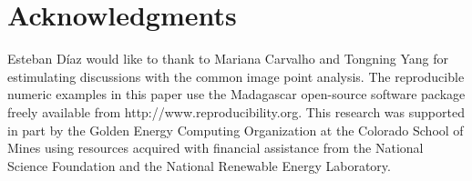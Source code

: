 \section{Acknowledgments}
Esteban D\'{i}az would like to thank to Mariana Carvalho and Tongning Yang for estimulating discussions
with the common image point analysis.
%
%
The reproducible numeric examples in this paper use the Madagascar open-source software package freely available from http://www.reproducibility.org.
%
This research was supported in part by the Golden Energy Computing Organization at the Colorado School of Mines using resources acquired with financial assistance from the National Science Foundation and the National Renewable Energy Laboratory.


